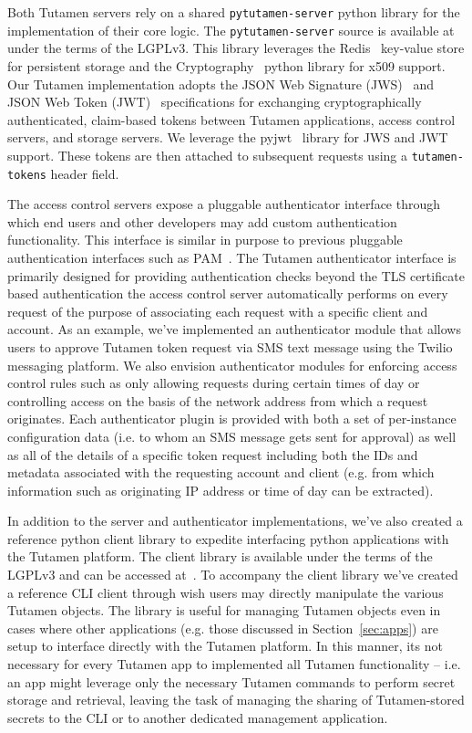 Both Tutamen servers rely on a shared \texttt{pytutamen-server} python
library for the implementation of their core logic. The
\texttt{pytutamen-server} source is available
at~\cite{src-tutamen-pytutamenserver} under the terms of the
LGPLv3. This library leverages the Redis~\cite{redis} key-value store
for persistent storage and the Cryptography~\cite{python-cryptography}
python library for x509 support. Our Tutamen implementation adopts the
JSON Web Signature (JWS)~\cite{rfc7515} and JSON Web Token
(JWT)~\cite{rfc7519} specifications for exchanging cryptographically
authenticated, claim-based tokens between Tutamen applications, access
control servers, and storage servers. We leverage the
pyjwt~\cite{pyjwt} library for JWS and JWT support. These tokens are
then attached to subsequent requests using a \texttt{tutamen-tokens}
header field.

The access control servers expose a pluggable authenticator interface
through which end users and other developers may add custom
authentication functionality. This interface is similar in purpose to
previous pluggable authentication interfaces such as
PAM~\cite{samar1996}. The Tutamen authenticator interface is primarily
designed for providing authentication checks beyond the TLS
certificate based authentication the access control server
automatically performs on every request of the purpose of associating
each request with a specific client and account. As an example, we've
implemented an authenticator module that allows users to approve
Tutamen token request via SMS text message using the
Twilio~\cite{twilio} messaging platform. We also envision
authenticator modules for enforcing access control rules such as only
allowing requests during certain times of day or controlling access on
the basis of the network address from which a request originates. Each
authenticator plugin is provided with both a set of per-instance
configuration data (i.e. to whom an SMS message gets sent for
approval) as well as all of the details of a specific token request
including both the IDs and metadata associated with the requesting
account and client (e.g. from which information such as originating IP
address or time of day can be extracted).

In addition to the server and authenticator implementations, we've
also created a reference python client library to expedite interfacing
python applications with the Tutamen platform. The client library is
available under the terms of the LGPLv3 and can be accessed
at~\cite{src-tutamen-pytutamen}. To accompany the client library we've
created a reference CLI client through wish users may directly
manipulate the various Tutamen objects. The library is useful for
managing Tutamen objects even in cases where other applications
(e.g. those discussed in Section~\ref{sec:apps}) are setup to
interface directly with the Tutamen platform. In this manner, its not
necessary for every Tutamen app to implemented all Tutamen
functionality -- i.e. an app might leverage only the necessary Tutamen
commands to perform secret storage and retrieval, leaving the task of
managing the sharing of Tutamen-stored secrets to the CLI or to
another dedicated management application.


